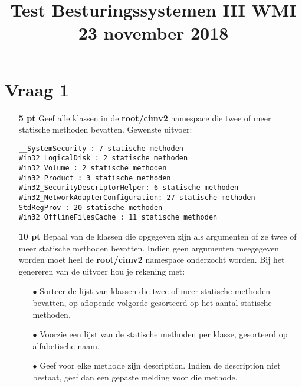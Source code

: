 \documentclass{article}
\begin{document}
\title{Test Besturingssystemen III WMI 23 november 2018}
\date{}
\author{}
\maketitle

\section*{Vraag 1} 
\begin{itemize}
    \item[\textbf{5 pt}] Geef alle klassen in de \textbf{root/cimv2} namespace die twee of meer statische methoden bevatten. Gewenste uitvoer:
        \begin{lstlisting}
__SystemSecurity : 7 statische methoden
Win32_LogicalDisk : 2 statische methoden
Win32_Volume : 2 statische methoden
Win32_Product : 3 statische methoden
Win32_SecurityDescriptorHelper: 6 statische methoden
Win32_NetworkAdapterConfiguration: 27 statische methoden
StdRegProv : 20 statische methoden
Win32_OfflineFilesCache : 11 statische methoden
        \end{lstlisting}
    \item[\textbf{10 pt}] Bepaal van de klassen die opgegeven zijn als argumenten of ze twee of meer statische methoden bevatten. Indien geen argumenten meegegeven worden moet heel de \textbf{root/cimv2} namespace onderzocht worden. Bij het genereren van de uitvoer hou je rekening met:
    \begin{itemize}
        \item[$\bullet$] Sorteer de lijst van klassen die twee of meer statische methoden bevatten, op aflopende volgorde gesorteerd op het aantal statische methoden.
        \item[$\bullet$] Voorzie een lijst van de statische methoden per klasse, gesorteerd op alfabetische naam.
        \item[$\bullet$] Geef voor elke methode zijn description. Indien de description niet bestaat, geef dan een gepaste melding voor die methode.
    \end{itemize}
\end{itemize}
\end{document}
